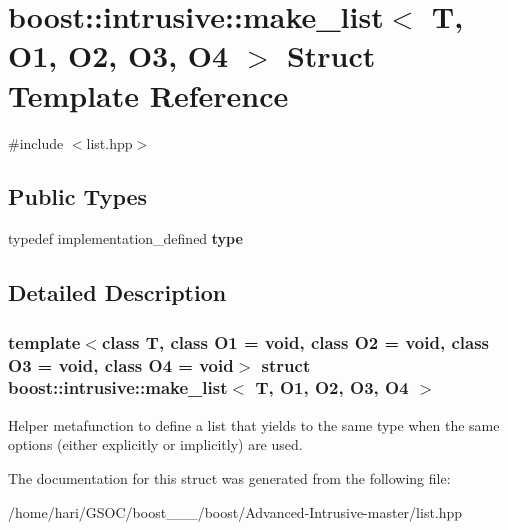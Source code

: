 \hypertarget{structboost_1_1intrusive_1_1make__list}{}\section{boost\+:\+:intrusive\+:\+:make\+\_\+list$<$ T, O1, O2, O3, O4 $>$ Struct Template Reference}
\label{structboost_1_1intrusive_1_1make__list}


{\ttfamily \#include $<$list.\+hpp$>$}

\subsection*{Public Types}
\begin{DoxyCompactItemize}
\item 
\mbox{\label{structboost_1_1intrusive_1_1make__list_a952a8b553ca84125fc1e7c56d5c141b4}} 
typedef implementation\+\_\+defined {\bfseries type}
\end{DoxyCompactItemize}


\subsection{Detailed Description}
\subsubsection*{template$<$class T, class O1 = void, class O2 = void, class O3 = void, class O4 = void$>$\newline
struct boost\+::intrusive\+::make\+\_\+list$<$ T, O1, O2, O3, O4 $>$}

Helper metafunction to define a {\ttfamily list} that yields to the same type when the same options (either explicitly or implicitly) are used. 

The documentation for this struct was generated from the following file\+:\begin{DoxyCompactItemize}
\item 
/home/hari/\+G\+S\+O\+C/boost\+\_\+\_\+\_/boost/\+Advanced-\/\+Intrusive-\/master/list.\+hpp\end{DoxyCompactItemize}

